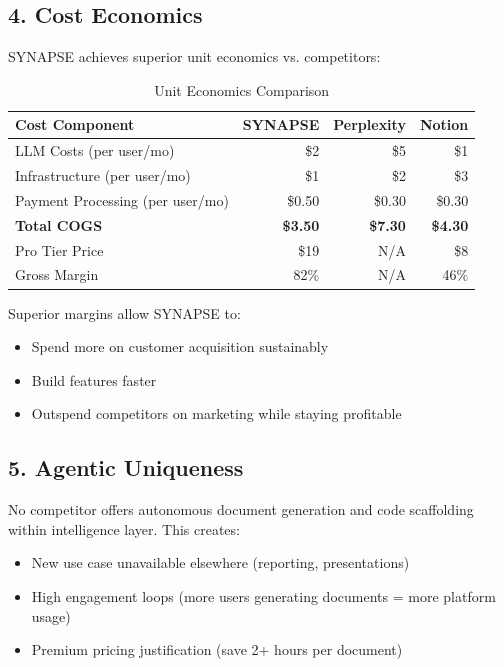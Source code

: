 \documentclass{report}
\begin{document}
\subsection{4. Cost Economics}

SYNAPSE achieves superior unit economics vs. competitors:

\begin{table}[h]
\centering
\begin{tabular}{|l|r|r|r|}
\toprule
\textbf{Cost Component} & \textbf{SYNAPSE} & \textbf{Perplexity} & \textbf{Notion} \\
\midrule
LLM Costs (per user/mo) & \$2 & \$5 & \$1 \\
Infrastructure (per user/mo) & \$1 & \$2 & \$3 \\
Payment Processing (per user/mo) & \$0.50 & \$0.30 & \$0.30 \\
\midrule
\textbf{Total COGS} & \textbf{\$3.50} & \textbf{\$7.30} & \textbf{\$4.30} \\
\midrule
Pro Tier Price & \$19 & N/A & \$8 \\
Gross Margin & 82\% & N/A & 46\% \\
\bottomrule
\end{tabular}
\caption{Unit Economics Comparison}
\end{table}

Superior margins allow SYNAPSE to:
\begin{itemize}
    \item Spend more on customer acquisition sustainably
    \item Build features faster
    \item Outspend competitors on marketing while staying profitable
\end{itemize}

\subsection{5. Agentic Uniqueness}

No competitor offers autonomous document generation and code scaffolding within intelligence layer. This creates:

\begin{itemize}
    \item New use case unavailable elsewhere (reporting, presentations)
    \item High engagement loops (more users generating documents = more platform usage)
    \item Premium pricing justification (save 2+ hours per document)
\end{itemize}
\end{document}
